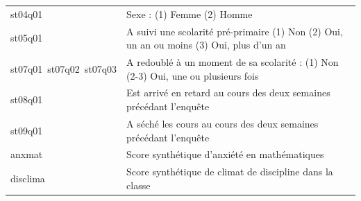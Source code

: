 \documentclass[12pt,twosided, notitlepage]{book}
\begin{document}
\begin{longtable}[]{@{}ll@{}}
\begin{minipage}[t]{0.38\columnwidth}
st04q01\strut
\end{minipage} & \begin{minipage}[t]{0.56\columnwidth}\raggedright
Sexe : (1) Femme (2) Homme\strut
\end{minipage}\tabularnewline
\begin{minipage}[t]{0.38\columnwidth}\raggedright
st05q01\strut
\end{minipage} & \begin{minipage}[t]{0.56\columnwidth}\raggedright
A suivi une scolarité pré-primaire (1) Non (2) Oui, un an ou moins (3)
Oui, plus d'un an\strut
\end{minipage}\tabularnewline
\begin{minipage}[t]{0.38\columnwidth}\raggedright
st07q01~st07q02~st07q03\strut
\end{minipage} & \begin{minipage}[t]{0.56\columnwidth}\raggedright
A redoublé à un moment de sa scolarité : (1) Non (2-3) Oui, une ou
plusieurs fois\strut
\end{minipage}\tabularnewline
\begin{minipage}[t]{0.38\columnwidth}\raggedright
st08q01\strut
\end{minipage} & \begin{minipage}[t]{0.56\columnwidth}\raggedright
Est arrivé en retard au cours des deux semaines précédant
l'enquête\strut
\end{minipage}\tabularnewline
\begin{minipage}[t]{0.38\columnwidth}\raggedright
st09q01\strut
\end{minipage} & \begin{minipage}[t]{0.56\columnwidth}\raggedright
A séché les cours au cours des deux semaines précédant l'enquête\strut
\end{minipage}\tabularnewline
\begin{minipage}[t]{0.38\columnwidth}\raggedright
anxmat\strut
\end{minipage} & \begin{minipage}[t]{0.56\columnwidth}\raggedright
Score synthétique d'anxiété en mathématiques\strut
\end{minipage}\tabularnewline
\begin{minipage}[t]{0.38\columnwidth}\raggedright
disclima\strut
\end{minipage} & \begin{minipage}[t]{0.56\columnwidth}\raggedright
Score synthétique de climat de discipline dans la classe\strut
\end{minipage}\tabularnewline

\end{longtable}
\end{document}
